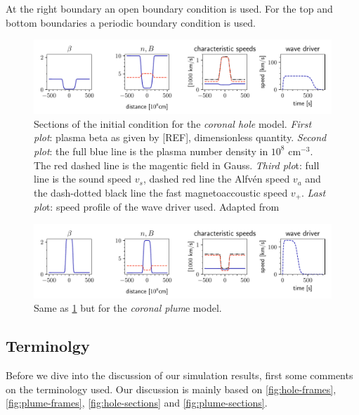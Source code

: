 At the right boundary an open boundary condition is used. For the top and bottom boundaries a periodic boundary condition is used.

\begin{figure}[H]
	\centering
	\includegraphics[width=.9\linewidth]{images/sections-initial-condition-hole.pdf}
	\caption{Sections of the initial condition for the \emph{coronal hole} model. 
		\emph{First plot}: plasma beta as given by [REF], dimensionless quantity.
		\emph{Second plot}: the full blue line is the plasma number density in $10^8$ cm$^{-3}$.
The red dashed line is the magentic field in Gauss.
\emph{Third plo}t: full line is the sound speed $v_s$, dashed red line the Alfvén speed $v_a$ and the dash-dotted black line the fast magnetoaccoustic speed $v_+$.
\emph{Last plo}t: speed profile of the wave driver used.
Adapted from \cite{coronal-hole}}
	\label{fig:hole-initial}
\end{figure}

\begin{figure}[H]
	\centering
	\includegraphics[width=.9\linewidth]{images/sections-initial-condition-plume.pdf}
	\caption{Same as \cref{fig:hole-initial} but for the \emph{coronal plum}e model.}
	\label{fig:plume-initial}
\end{figure}

\subsection{Terminolgy}
Before we dive into the discussion of our simulation results, first some comments on the terminology used.
Our discussion is mainly based on \cref{fig:hole-frames}, \cref{fig:plume-frames}, \cref{fig:hole-sections} and \cref{fig:plume-sections}.

